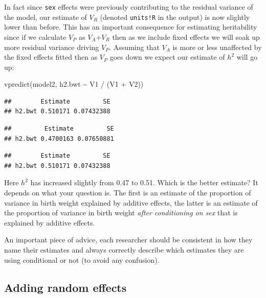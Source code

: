 \documentclass[
  12pt,
]{book}
\newenvironment{Shaded}{\begin{snugshade}}{\end{snugshade}}
\newcommand{\FunctionTok}[1]{\textcolor[rgb]{0.00,0.00,0.00}{#1}}
\newcommand{\NormalTok}[1]{#1}
\newcommand{\SpecialCharTok}[1]{\textcolor[rgb]{0.00,0.00,0.00}{#1}}
\begin{document}
In fact since \texttt{sex} effects were previously contributing to the residual variance of the model, our estimate of \(V_R\) (denoted \texttt{units!R} in the output) is now slightly lower than before. This has an important consequence for estimating heritability since if we calculate \(V_P\) as \(V_A\)+\(V_R\) then as we include fixed effects we will soak up more residual variance driving \(V_P\). Assuming that \(V_A\) is more or less unaffected by the fixed effects fitted then as \(V_P\) goes down we expect our estimate of \(h^2\) will go up:

\begin{Shaded}
\begin{Highlighting}[]
\FunctionTok{vpredict}\NormalTok{(model2, h2.bwt }\SpecialCharTok{\textasciitilde{}}\NormalTok{ V1 }\SpecialCharTok{/}\NormalTok{ (V1 }\SpecialCharTok{+}\NormalTok{ V2))}
\end{Highlighting}
\end{Shaded}

\begin{verbatim}
##        Estimate         SE
## h2.bwt 0.510171 0.07432388
\end{verbatim}

\begin{verbatim}
##         Estimate         SE
## h2.bwt 0.4700163 0.07650881
\end{verbatim}

\begin{verbatim}
##        Estimate         SE
## h2.bwt 0.510171 0.07432388
\end{verbatim}

Here \(h^2\) has increased slightly from 0.47 to 0.51. Which is the better estimate? It depends on what your question is. The first is an estimate of the proportion of variance in birth weight explained by additive effects, the latter is an estimate of the proportion of variance in birth weight \emph{after conditioning on sex} that is explained by additive effects.

An important piece of advice, each researcher should be consistent in how they name their estimates and always correctly describe which estimates they are using conditional or not (to avoid any confusion).

\hypertarget{adding-random-effects}{%
\subsection{Adding random effects}\label{adding-random-effects}}
\end{document}
